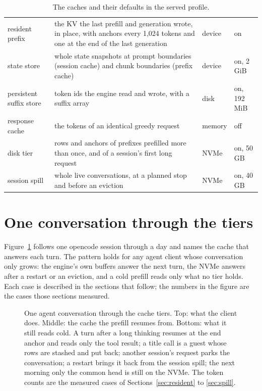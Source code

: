 \begin{table}[htbp]
\centering\small
\caption{The caches and their defaults in the served profile.}\label{tab:caches}
\begin{tabularx}{\linewidth}{@{}L{.2\linewidth}YL{.14\linewidth}L{.2\linewidth}@{}}
\toprule
{} &  &  &  \\
\midrule
resident prefix & the KV the last prefill and generation wrote, in place, with anchors every 1,024 tokens and one at the end of the last generation & device & on \\
state store & whole state snapshots at prompt boundaries (session cache) and chunk boundaries (prefix cache) & device & on, 2 GiB \\
persistent suffix store & token ids the engine read and wrote, with a suffix array & disk & on, 192 MiB \\
response cache & the tokens of an identical greedy request & memory & off \\
disk tier & rows and anchors of prefixes prefilled more than once, and of a session's first long request & NVMe & on, 50 GB \\
session spill & whole live conversations, at a planned stop and before an eviction & NVMe & on, 40 GB \\
\bottomrule
\end{tabularx}
\end{table}

\section{One conversation through the tiers}

Figure~\ref{fig:session-caches} follows one opencode session through a day and names the cache that answers each turn. The pattern holds for any agent client whose conversation only grows: the engine's own buffers answer the next turn, the NVMe answers after a restart or an eviction, and a cold prefill reads only what no tier holds. Each case is described in the sections that follow; the numbers in the figure are the cases those sections measured.

\begin{figure}[htbp]
\centering

\caption[One conversation through the cache tiers]{One agent conversation through the cache tiers. Top: what the client does. Middle: the cache the prefill resumes from. Bottom: what it still reads cold. A turn after a long thinking resumes at the end anchor and reads only the tool result; a title call is a guest whose rows are stashed and put back; another session's request parks the conversation; a restart brings it back from the session spill; the next morning only the common head is still on the NVMe. The token counts are the measured cases of Sections~\ref{sec:resident} to \ref{sec:spill}.}\label{fig:session-caches}
\end{figure}

